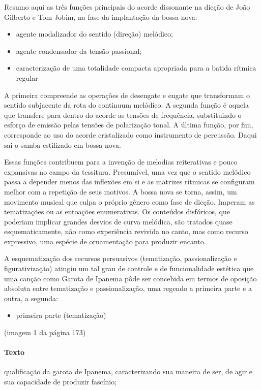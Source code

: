Resumo aqui as três funções principais do acorde dissonante na dicção de
João Gilberto e Tom Jobim, na fase da implantação da bossa nova:

\begin{itemize}
\item
  agente modalizador do sentido (direção) melódico;
\item
  agente condensador da tensão passional;
\item
  caracterização de uma totalidade compacta apropriada para a batida
  rítmica regular
\end{itemize}

A primeira compreende as operações de desengate e engate que transformam
o sentido subjacente da rota do continuum melódico. A segunda função é
aquela que transfere para dentro do acorde as tensões de frequência,
substituindo o esforço de emissão pelas tensões de polarização tonal. A
última função, por fim, corresponde ao uso do acorde cristalizado como
instrumento de percussão. Daqui sai o samba estilizado em bossa nova.

Essas funções contribuem para a invenção de melodias reiterativas e
pouco expansivas no campo da tessitura. Presumível, uma vez que o
sentido melódico passa a depender menos das inflexões em si e as
matrizes rítmicas se configuram melhor com a repetição de seus motivos.
A bossa nova se torna, assim, um movimento musical que culpa o próprio
gênero como fase de dicção. Imperam as tematizações ou as entoações
enumerativas. Os conteúdos disfóricos, que poderiam implicar grandes
desvios de curva melódica, são tratados quase esquematicamente, não como
experiência revivida no canto, mas como recurso expressivo, uma espécie
de ornamentação para produzir encanto.

A esquematização dos recursos persuasivos (tematização, passionalização
e figurativização) atingiu um tal grau de controle e de funcionalidade
estética que uma canção como Garota de Ipanema pôde ser concebida em
termos de oposição absoluta entre tematização e passionalização, uma
regendo a primeira parte e a outra, a segunda:

\begin{itemize}
\item
  primeira parte (tematização)
\end{itemize}

(imagem 1 da página 173)

\paragraph{Texto}
qualificação da garota de Ipanema, caracterizando sua maneira de ser, de
agir e sua capacidade de produzir fascínio;

